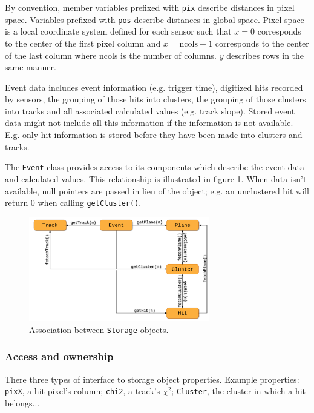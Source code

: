 \documentclass[10pt,a4paper]{book}
\begin{document}
By convention, member variables prefixed with \Verb`pix` describe distances in pixel space. Variables prefixed with \Verb`pos` describe distances in global space. Pixel space is a local coordinate system defined for each sensor such that $x = 0$ corresponds to the center of the first pixel column and $x = \mathrm{ncols} - 1$ corresponds to the center of the last column where ncols is the number of columns. $y$ describes rows in the same manner.

Event data includes event information (e.g. trigger time), digitized hits recorded by sensors, the grouping of those hits into clusters, the grouping of those clusters into tracks and all associated calculated values (e.g. track slope). Stored event data might not include all this information if the information is not available. E.g. only hit information is stored before they have been made into clusters and tracks.

The \Verb`Event` class provides access to its components which describe the event data and calculated values. This relationship is illustrated in figure \ref{fig:modules_storage_objects}. When data isn't available, null pointers are passed in lieu of the object; e.g. an unclustered hit will return 0 when calling \Verb`getCluster()`.

\begin{figure}[htb]
  \centering
  \includegraphics[width=0.7\textwidth]{images/modules_storage_objects.pdf}
  \caption{Association between \protect\Verb`Storage` objects.}
  \label{fig:modules_storage_objects}
\end{figure}

\subsubsection*{Access and ownership}

There three types of interface to storage object properties. Example properties: \Verb`pixX`, a hit pixel's column; \Verb`chi2`, a track's $\chi^2$; \Verb`Cluster`, the cluster in which a hit belongs...
\end{document}
